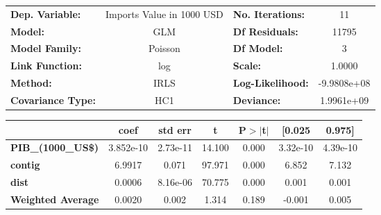 \begin{center}
\begin{tabular}{lclc}
\toprule
\textbf{Dep. Variable:}    & Imports Value in 1000 USD & \textbf{  No. Iterations:    } &      11      \\
\textbf{Model:}            &            GLM            & \textbf{  Df Residuals:      } &    11795     \\
\textbf{Model Family:}     &          Poisson          & \textbf{  Df Model:          } &      3       \\
\textbf{Link Function:}    &            log            & \textbf{  Scale:             } &     1.0000   \\
\textbf{Method:}           &            IRLS           & \textbf{  Log-Likelihood:    } & -9.9808e+08  \\
\textbf{Covariance Type:}  &            HC1            & \textbf{  Deviance:          } &  1.9961e+09  \\
\bottomrule
\end{tabular}
\begin{tabular}{lcccccc}
                           & \textbf{coef} & \textbf{std err} & \textbf{t} & \textbf{P$> |$t$|$} & \textbf{[0.025} & \textbf{0.975]}  \\
\midrule
\textbf{PIB\_(1000\_US\$)} &    3.852e-10  &     2.73e-11     &    14.100  &         0.000        &     3.32e-10    &     4.39e-10     \\
\textbf{contig}            &       6.9917  &        0.071     &    97.971  &         0.000        &        6.852    &        7.132     \\
\textbf{dist}              &       0.0006  &     8.16e-06     &    70.775  &         0.000        &        0.001    &        0.001     \\
\textbf{Weighted Average}  &       0.0020  &        0.002     &     1.314  &         0.189        &       -0.001    &        0.005     \\
\bottomrule
\end{tabular}
\end{center}